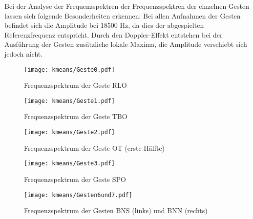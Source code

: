 Bei der Analyse der Frequenzspektren der Frequenzspektren der einzelnen Gesten lassen sich folgende Besonderheiten erkennen:
Bei allen Aufnahmen der Gesten befindet sich die Amplitude bei 18500 Hz, da dies der abgespielten Referenzfrequenz entspricht. Durch den Doppler-Effekt entstehen bei der Ausführung der Gesten zusätzliche lokale Maxima, die Amplitude verschiebt sich jedoch nicht.

\begin{figure*}[htbp]
    \centering
   \texttt{[image: kmeans/Geste0.pdf]}
\caption{Frequenzspektrum der Geste \ac{RLO}}
\label{fig:kMeansGeste0}
\end{figure*}

\begin{figure*}[htbp]
    \centering
   \texttt{[image: kmeans/Geste1.pdf]}
\caption{Frequenzspektrum der Geste \ac{TBO}}
\label{fig:kMeansGeste1}
\end{figure*}

\begin{figure*}[htbp]
    \centering
   \texttt{[image: kmeans/Geste2.pdf]}
\caption{Frequenzspektrum der Geste \ac{OT} (erste Hälfte)}
\label{fig:kMeansGeste2}
\end{figure*}

\begin{figure*}[htbp]
    \centering
   \texttt{[image: kmeans/Geste3.pdf]}
\caption{Frequenzspektrum der Geste \ac{SPO}}
\label{fig:kMeansGeste3}
\end{figure*}

\begin{figure*}[htbp]
    \centering
   \texttt{[image: kmeans/Gesten6und7.pdf]}
\caption{Frequenzspektrum der Gesten \ac{BNS} (links) und \ac{BNN} (rechts)}
\label{fig:kMeansGesten6und7}
\end{figure*}


